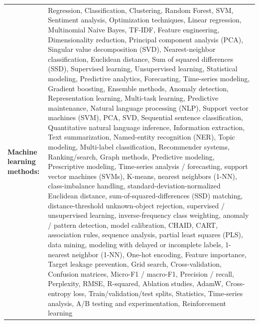 \documentclass[letterpaper,11pt]{article}
\begin{document}
\begin{tabularx}{\linewidth}{@{}>{\raggedright\arraybackslash}p{1.8in}X@{}}
\textbf{Machine learning methods:} & \footnotesize{Regression, Classification, Clustering, Random Forest, SVM, Sentiment analysis, Optimization techniques, Linear regression, Multinomial Naive Bayes, TF-IDF, Feature engineering, Dimensionality reduction, Principal component analysis (PCA), Singular value decomposition (SVD), Nearest-neighbor classification, Euclidean distance, Sum of squared differences (SSD), Supervised learning, Unsupervised learning, Statistical modeling, Predictive analytics, Forecasting, Time-series modeling, Gradient boosting, Ensemble methods, Anomaly detection, Representation learning, Multi-task learning, Predictive maintenance, Natural language processing (NLP), Support vector machines (SVM), PCA, SVD, Sequential sentence classification, Quantitative natural language inference, Information extraction, Text summarization, Named-entity recognition (NER), Topic modeling, Multi-label classification, Recommender systems, Ranking/search, Graph methods, Predictive modeling, Prescriptive modeling, Time-series analysis / forecasting, support vector machines (SVMs), K-means, nearest neighbors (1-NN), class-imbalance handling, standard-deviation-normalized Euclidean distance, sum-of-squared-differences (SSD) matching, distance-threshold unknown-object rejection, supervised / unsupervised learning, inverse-frequency class weighting, anomaly / pattern detection, model calibration, CHAID, CART, association rules, sequence analysis, partial least squares (PLS), data mining, modeling with delayed or incomplete labels, 1-nearest neighbor (1-NN), One-hot encoding, Feature importance, Target leakage prevention, Grid search, Cross-validation, Confusion matrices, Micro-F1 / macro-F1, Precision / recall, Perplexity, RMSE, R-squared, Ablation studies, AdamW, Cross-entropy loss, Train/validation/test splits, Statistics, Time-series analysis, A/B testing and experimentation, Reinforcement learning}\\
\end{tabularx}
\par\vspace{2pt}
\end{document}
